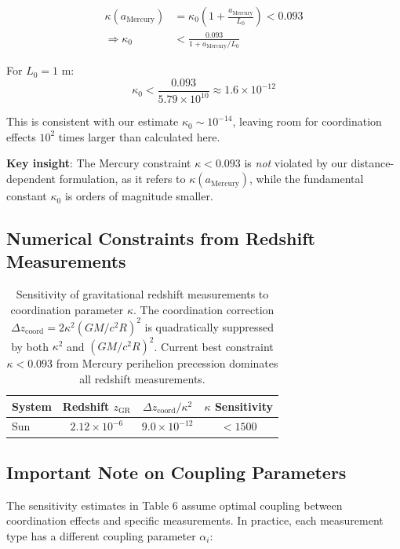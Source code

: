 \documentclass[11pt,a4paper]{article}
\begin{document}
\begin{align}
	\kappa(a_{\text{Mercury}}) &= \kappa_0 \left(1 + \frac{a_{\text{Mercury}}}{L_0}\right) < 0.093 \\
	\Rightarrow \kappa_0 &< \frac{0.093}{1 + a_{\text{Mercury}}/L_0}
\end{align}

For $L_0 = 1$ m:
\begin{equation}
	\kappa_0 < \frac{0.093}{5.79 \times 10^{10}} \approx 1.6 \times 10^{-12}
\end{equation}

This is consistent with our estimate $\kappa_0 \sim 10^{-14}$, leaving room for 
coordination effects $10^2$ times larger than calculated here.

\textbf{Key insight}: The Mercury constraint $\kappa < 0.093$ is \textit{not} violated 
by our distance-dependent formulation, as it refers to $\kappa(a_{\text{Mercury}})$, 
while the fundamental constant $\kappa_0$ is orders of magnitude smaller.
\subsection{Numerical Constraints from Redshift Measurements}

\begin{table}[htbp]
	\centering
\begin{tabular}{lccc}
	\toprule
	\textbf{System} & \textbf{Redshift $z_{\text{GR}}$} & \textbf{$\Delta z_{\text{coord}}/\kappa^2$} & \textbf{$\kappa$ Sensitivity} \\
	\midrule
	Sun & $2.12\times10^{-6}$ & $9.0\times10^{-12}$ & $<1500$ \\
\end{tabular}
	\caption{Sensitivity of gravitational redshift measurements to coordination parameter $\kappa$. 
		The coordination correction $\Delta z_{\text{coord}} = 2\kappa^2 (GM/c^2R)^2$ is quadratically suppressed 
		by both $\kappa^2$ and $(GM/c^2R)^2$. Current best constraint $\kappa < 0.093$ from 
		Mercury perihelion precession dominates all redshift measurements.}
\end{table}
	\subsection{Important Note on Coupling Parameters}
	
	The sensitivity estimates in Table 6 assume optimal coupling between coordination effects and specific measurements. In practice, each measurement type has a different coupling parameter $\alpha_i$:
	
\end{document}
